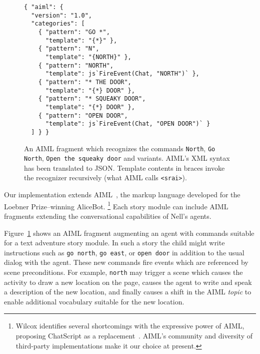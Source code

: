 \documentclass[preprint]{sig-alternate}
\begin{document}
\begin{figure}\small
\begin{verbatim}
{ "aiml": {
  "version": "1.0",
  "categories": [
    { "pattern": "GO *",
      "template": "{*}" },
    { "pattern": "N",
      "template": "{NORTH}" },
    { "pattern": "NORTH",
      "template": js`FireEvent(Chat, "NORTH")` },
    { "pattern": "* THE DOOR",
      "template": "{*} DOOR" },
    { "pattern": "* SQUEAKY DOOR",
      "template": "{*} DOOR" },
    { "pattern": "OPEN DOOR",
      "template": js`FireEvent(Chat, "OPEN DOOR")` }
  ] } }
\end{verbatim}
\caption{An AIML fragment which recognizes the commands
  \texttt{North}, \texttt{Go North}, \texttt{Open the squeaky door}
  and variants.  AIML's XML syntax has been translated to JSON.
  Template contents in braces invoke the recognizer recursively
  (what AIML calls \texttt{<srai>}).
}\label{fig:aiml}
\end{figure}

Our implementation extends AIML~\cite{aiml:2005},
the markup language developed for the Loebner Prize--winning
AliceBot.%
\footnote{Wilcox identifies several shortcomings with the expressive
  power of AIML, proposing ChatScript as a
  replacement~\cite{wilcox:2010}.  AIML's community and
  diversity of third-party implementations make it our choice at present.}
Each story module can include AIML fragments extending the
conversational capabilities of Nell's agents.

Figure~\ref{fig:aiml}
shows an AIML fragment augmenting an agent with
commands suitable for a text adventure story module.
In such a story the child might write instructions such as
\texttt{go north}, \texttt{go east}, or \texttt{open door} in
addition to the usual dialog with the agent.
These new commands fire events which are referenced by scene
preconditions.  For example, \texttt{north} may
trigger a scene which causes the activity to draw a new location on
the page, causes the agent to write and speak a description of the new
location, and finally causes a shift in the AIML \textit{topic} to
enable additional vocabulary suitable for the new location.
\end{document}
